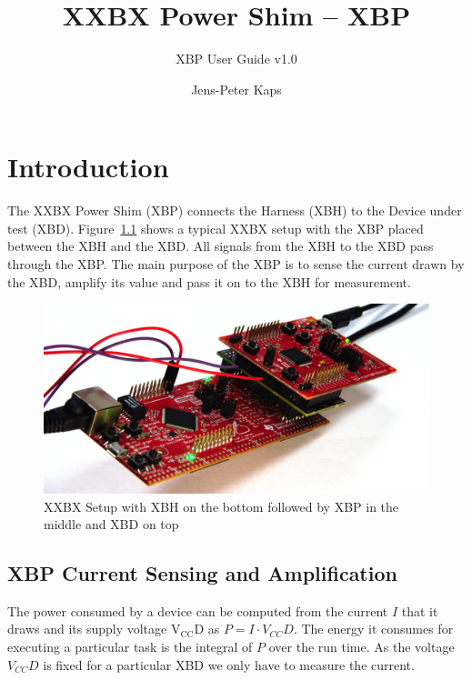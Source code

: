 \documentclass[twoside,11pt]{cergdoc}
\begin{document}
\title{XXBX Power Shim -- XBP}
\subtitle{XBP User Guide v1.0}
\author{Jens-Peter Kaps}

\maketitle

\tableofcontents

\chapter{Introduction}
The XXBX Power Shim (XBP) connects the Harness (XBH) to the Device under test (XBD). Figure~\ref{fig:xxbxsetup}
shows a typical XXBX setup with the XBP placed between the XBH and the XBD. All signals from the 
XBH to the XBD pass through the XBP. The main purpose of the XBP is to sense the current 
drawn by the XBD, amplify its value and pass it on to the XBH for measurement. 

\begin{figure}[ht]
  \begin{center}
    \includegraphics[scale=1]{figures/xxbx-setup-side}
    \caption{XXBX Setup with XBH on the bottom followed by XBP in the middle and XBD on top}\label{fig:xxbxsetup}
  \end{center}
\end{figure}

\section{XBP Current Sensing and Amplification}
The power consumed by a device can be computed from the current $I$ that it draws and
its supply voltage $\mathrm{V_{CC}D}$ as $P = I \cdot V_{CC}D$. The energy it 
consumes for executing a particular task is the integral of $P$ over the run time.
As the voltage $V_{CC}D$ is fixed for a particular XBD we only have to measure 
the current.
\end{document}
